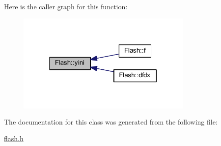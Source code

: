 Here is the caller graph for this function\+:
\nopagebreak
\begin{figure}[H]
\begin{center}
\leavevmode
\includegraphics[width=243pt]{class_flash_a5bebef2024531af739160f0fc23e3086_icgraph}
\end{center}
\end{figure}


The documentation for this class was generated from the following file\+:\begin{DoxyCompactItemize}
\item 
\mbox{\hyperlink{flash_8h}{flash.\+h}}\end{DoxyCompactItemize}
